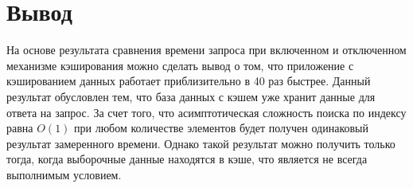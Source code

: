 \section*{Вывод}

На основе результата сравнения времени запроса при включенном и отключенном механизме кэширования можно сделать вывод о том, что приложение с кэшированием данных работает приблизительно в 40 раз быстрее. Данный результат обусловлен тем, что база данных с кэшем уже хранит данные для ответа на запрос. За счет того, что асимптотическая сложность поиска по индексу равна $O(1)$ при любом количестве элементов будет получен одинаковый результат замеренного времени. Однако такой результат можно получить только тогда, когда выборочные данные находятся в кэше, что является не всегда выполнимым условием. 